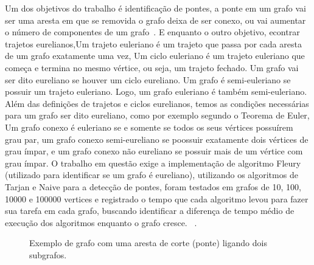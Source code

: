 \documentclass{sbc2023}%
\begin{document}
Um dos objetivos do trabalho é identificação de pontes, a ponte em um grafo vai ser uma aresta em que se removida o grafo deixa de ser conexo, ou vai aumentar o número de componentes de um grafo~\citep{ref4}. E enquanto o outro objetivo, econtrar trajetos eurelianos,Um trajeto euleriano é um trajeto que passa por cada aresta de um grafo exatamente uma vez, Um ciclo euleriano é um trajeto euleriano que começa e termina no mesmo vértice, ou seja, um trajeto fechado. Um grafo vai ser dito eureliano se houver um ciclo eureliano. Um grafo é semi-euleriano se possuir um trajeto euleriano. Logo, um grafo euleriano é também semi-euleriano. Além das definições de trajetos e ciclos eurelianos, temos as condições necessárias para um grafo ser dito eureliano, como por exemplo segundo o Teorema de Euler, Um grafo conexo é euleriano se e somente se todos os seus vértices possuírem grau par, um grafo conexo semi-eureliano se poossuir exatamente dois vértices de grau ímpar, e um grafo conexo não eureliano se possuir mais de um vértice com grau ímpar.
O trabalho em questão exige a implementação de algoritmo Fleury (utilizado para identificar se um grafo é eureliano), utilizando os algoritmos de Tarjan e Naive para a detecção de pontes, foram testados em grafos de 10, 100, 10000 e 100000 vertices e registrado o tempo que cada algoritmo levou para fazer sua tarefa em cada grafo, buscando identificar a diferença de tempo médio de execução dos algoritmos enquanto o grafo cresce. ~\citep{slide}. 
\begin{figure}[H]
    \centering
    \caption{Exemplo de grafo com uma aresta de corte (ponte) ligando dois subgrafos.}
    \label{fig:exemplo_grafo}
\end{figure}
\end{document}
